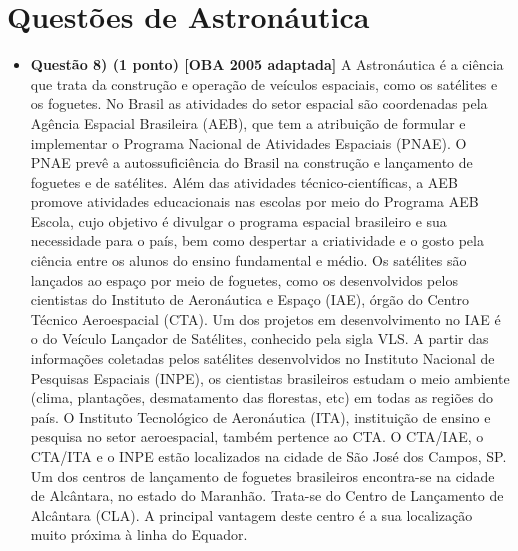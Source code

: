 \documentclass[a4paper, 12pt]{article}
\begin{document}
    \section*{Questões de Astronáutica}
        \begin{flushleft} \begin{itemize}
            \item \textbf{Questão 8) (1 ponto) [OBA 2005 adaptada]} A Astronáutica é a ciência que trata da construção e operação de veículos espaciais, como os satélites e os foguetes. \linebreak \linebreak No Brasil as atividades do setor espacial são coordenadas pela Agência Espacial Brasileira (AEB), que tem a atribuição de formular e implementar o Programa Nacional de Atividades Espaciais (PNAE). O PNAE prevê a autossuficiência do Brasil na construção e lançamento de foguetes e de satélites. Além das atividades técnico-científicas, a AEB promove atividades educacionais nas escolas por meio do Programa AEB Escola, cujo objetivo é divulgar o programa espacial brasileiro e sua necessidade para o país, bem como despertar a criatividade e o gosto pela ciência entre os alunos do ensino fundamental e médio. \linebreak \linebreak Os satélites são lançados ao espaço por meio de foguetes, como os desenvolvidos pelos cientistas do Instituto de Aeronáutica e Espaço (IAE), órgão do Centro Técnico Aeroespacial (CTA). Um dos projetos em desenvolvimento no IAE é o do Veículo Lançador de Satélites, conhecido pela sigla VLS. A partir das informações coletadas pelos satélites desenvolvidos no Instituto Nacional de Pesquisas Espaciais (INPE), os cientistas brasileiros estudam o meio ambiente (clima, plantações, desmatamento das florestas, etc) em todas as regiões do país. O Instituto Tecnológico de Aeronáutica (ITA), instituição de ensino e pesquisa no setor aeroespacial, também pertence ao CTA. O CTA/IAE, o CTA/ITA e o INPE estão localizados na cidade de São José dos Campos, SP. \linebreak \linebreak Um dos centros de lançamento de foguetes brasileiros encontra-se na cidade de Alcântara, no estado do Maranhão. Trata-se do Centro de Lançamento de Alcântara (CLA). A principal vantagem deste centro é a sua localização muito próxima à linha do Equador.
                \begin{figure}[H]
                    \centering

\end{figure}
\end{itemize}
\end{flushleft}
\end{document}
